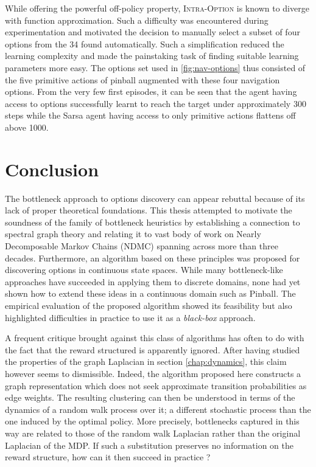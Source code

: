 \documentclass[12pt, oneside, extrafontsizes]{memoir}  %
\theoremstyle{plain}
\theoremstyle{definition}
\begin{document}
While offering the powerful off-policy property, \textsc{Intra-Option} is known to diverge with function approximation. Such a difficulty was encountered during experimentation and motivated the decision to manually select a subset of four options from the 34 found automatically. Such a simplification reduced the learning complexity and made the painstaking task of finding suitable learning parameters more easy. The options set used in \ref{fig:nav-options} thus consisted of the five primitive actions of pinball augmented with these four navigation options. From the very few first episodes, it can be seen that the agent having access to options successfully learnt to reach the target under approximately 300 steps while the Sarsa agent having access to only primitive actions flattens off above 1000. 


\chapter{Conclusion}

The bottleneck approach to options discovery can appear rebuttal because of its lack of proper theoretical foundations. This thesis attempted to motivate the soundness of the family of bottleneck heuristics by establishing a connection to spectral graph theory and relating it to vast body of work on Nearly Decomposable Markov Chains (NDMC) spanning across more than three decades. Furthermore, an algorithm based on these principles was proposed for discovering options in continuous state spaces. While many bottleneck-like approaches have succeeded in applying them to discrete domains, none had yet shown how to extend these ideas in a continuous domain such as Pinball. The empirical evaluation of the proposed algorithm showed its feasibility but also highlighted difficulties in practice to use it as a \textit{black-box} approach.

A frequent critique brought against this class of algorithms has often to do with the fact that the reward structured is apparently ignored. After having studied the properties of the graph Laplacian in section \ref{chap:dynamics}, this claim however seems to dismissible. Indeed, the algorithm proposed here constructs a graph representation which does not seek approximate transition probabilities as edge weights. The resulting clustering can then be understood in terms of the dynamics of a random walk process over it; a different stochastic process than the one induced by the optimal policy. More precisely, bottlenecks captured in this way are related to those of the random walk Laplacian rather than the original Laplacian of the MDP. If such a substitution preserves no information on the reward structure, how can it then succeed in practice ?
\end{document}

